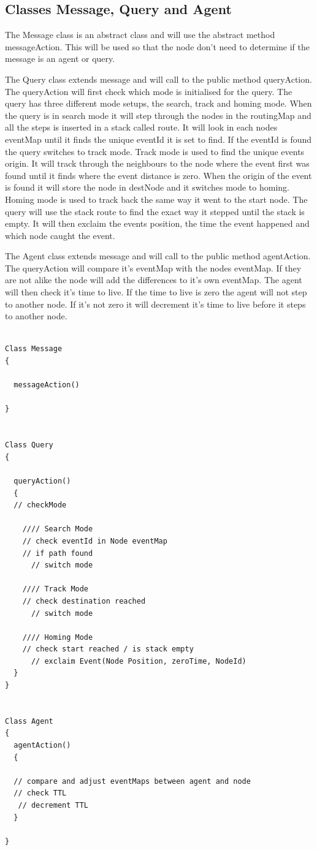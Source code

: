 \documentclass[a4paper,11pt,twoside]{article}
\begin{document}
\subsection{Classes Message, Query and Agent}
The Message class is an abstract class and will use the abstract
method messageAction. This will be used so that the node don’t need to
determine if the message is an agent or query.

The Query class extends message and will call to the public method
queryAction. The queryAction will first check which mode is
initialised for the query. The query has three different mode setups,
the search, track and homing mode. When the query is in search mode it
will step through the nodes in the routingMap and all the steps is
inserted in a stack called route. It will look in each nodes eventMap
until it finds the unique eventId it is set to find. If the eventId is
found the query switches to track mode.
Track mode is used to find the unique events origin. It will track
through the neighbours to the node where the event first was found
until it finds where the event distance is zero. When the origin of
the event is found it will store the node in destNode and it switches
mode to homing.
Homing mode is used to track back the same way it went to the start
node. The query will use the stack route to find the exact way it
stepped until the stack is empty.
It will then exclaim the events position, the time the event happened
and which node caught the event.

The Agent class extends message and will call to the public method
agentAction. The queryAction will compare it’s eventMap with the nodes
eventMap. If they are not alike the node will add the differences to
it’s own eventMap. The agent will then check it’s time to live. If the
time to live is zero the agent will not step to another node. If it's
not zero it will decrement it’s time to live before it steps to
another node.

\begin{verbatim}

Class Message
{

  messageAction()

}


Class Query
{

  queryAction()
  {
  // checkMode

    //// Search Mode
    // check eventId in Node eventMap
    // if path found
      // switch mode

    //// Track Mode
    // check destination reached
      // switch mode

    //// Homing Mode
    // check start reached / is stack empty
      // exclaim Event(Node Position, zeroTime, NodeId)
  }
}


Class Agent
{
  agentAction()
  {

  // compare and adjust eventMaps between agent and node
  // check TTL
   // decrement TTL
  }

}

\end{verbatim}
\end{document}
